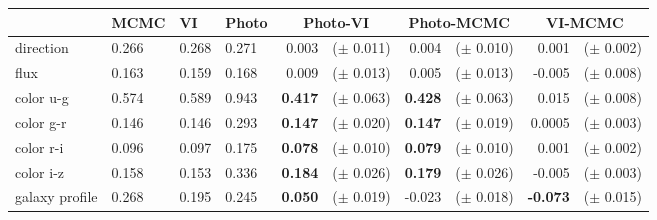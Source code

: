 \begin{tabular}{l|lll|rlrlrl}
\toprule
{} &    MCMC &      VI &   Photo &              \multicolumn{2}{c}{Photo-VI} &             \multicolumn{2}{c}{Photo-MCMC} &                \multicolumn{2}{c}{VI-MCMC} \\
\midrule
direction   &   0.266 &   0.268 &   0.271 &  0.003 & \hspace{-1em}($\pm$ 0.011) &   0.004 & \hspace{-1em}($\pm$ 0.010) &   0.001 & \hspace{-1em}($\pm$ 0.002) \\
flux &   0.163 &   0.159 &   0.168 &  0.009 & \hspace{-1em}($\pm$ 0.013) &   0.005 & \hspace{-1em}($\pm$ 0.013) &  -0.005 & \hspace{-1em}($\pm$ 0.008) \\
color u-g  &   0.574 &   0.589 &   0.943 &  \textbf{0.417} & \hspace{-1em}($\pm$ 0.063) &   \textbf{0.428} & \hspace{-1em}($\pm$ 0.063) &   0.015 & \hspace{-1em}($\pm$ 0.008) \\
color g-r  &   0.146 &   0.146 &   0.293 &  \textbf{0.147} & \hspace{-1em}($\pm$ 0.020) &   \textbf{0.147} & \hspace{-1em}($\pm$ 0.019) &   0.0005 & \hspace{-1em}($\pm$ 0.003) \\
color r-i  &   0.096 &   0.097 &   0.175 &  \textbf{0.078} & \hspace{-1em}($\pm$ 0.010) &   \textbf{0.079} & \hspace{-1em}($\pm$ 0.010) &   0.001 & \hspace{-1em}($\pm$ 0.002) \\
color i-z  &   0.158 &   0.153 &   0.336 &  \textbf{0.184} & \hspace{-1em}($\pm$ 0.026) &   \textbf{0.179} & \hspace{-1em}($\pm$ 0.026) &  -0.005 & \hspace{-1em}($\pm$ 0.003) \\
galaxy profile    &   0.268 &   0.195 &   0.245 &  \textbf{0.050} & \hspace{-1em}($\pm$ 0.019) &  -0.023 & \hspace{-1em}($\pm$ 0.018) &  \textbf{-0.073} & \hspace{-1em}($\pm$ 0.015) \\

\end{tabular}
